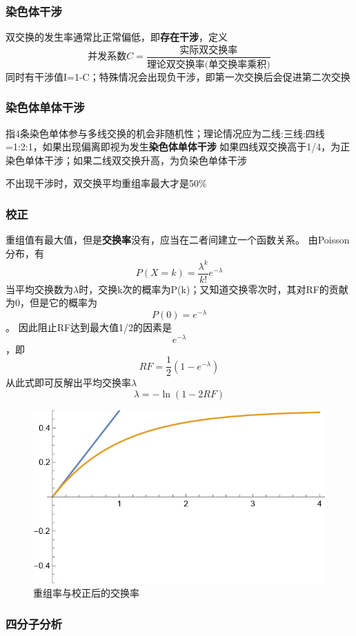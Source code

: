 \documentclass[a4paper, 12pt]{report}
\begin{document}
\subsubsection{染色体干涉}
双交换的发生率通常比正常偏低，即\textbf{存在干涉}，定义
\[
    \text{并发系数}C=\dfrac{\text{实际双交换率}}{\text{理论双交换率(单交换率乘积)}}
\]
同时有干涉值I=1-C；特殊情况会出现负干涉，即第一次交换后会促进第二次交换
\subsubsection{染色体单体干涉}
指4条染色单体参与多线交换的机会非随机性；理论情况应为二线:三线:四线=1:2:1，如果出现偏离即视为发生\textbf{染色体单体干涉}
如果四线双交换高于1/4，为正染色单体干涉；如果二线双交换升高，为负染色单体干涉

不出现干涉时，双交换平均重组率最大才是50\%
\subsubsection{校正}
重组值有最大值，但是\textbf{交换率}没有，应当在二者间建立一个函数关系。
由Poisson分布，有
\[
    P(X=k)=\frac{\lambda^k}{k!}e^{-\lambda}
\]
当平均交换数为\(\lambda\)时，交换k次的概率为P(k)；又知道交换零次时，其对RF的贡献为0，但是它的概率为\[P(0)=e^{-\lambda}\]。
因此阻止RF达到最大值1/2的因素是\[e^{-\lambda}\]，即
\[RF=\frac{1}{2}(1-e^{-\lambda})\]
从此式即可反解出平均交换率\(\lambda\)
\[
    \lambda=-\ln(1-2RF)
\]
\begin{figure}[htbp]
    \centering
    \includegraphics{交换率校正.png}
    \caption{重组率与校正后的交换率}
    \label{交换&重组}
\end{figure}
\subsubsection{四分子分析}
\end{document}

